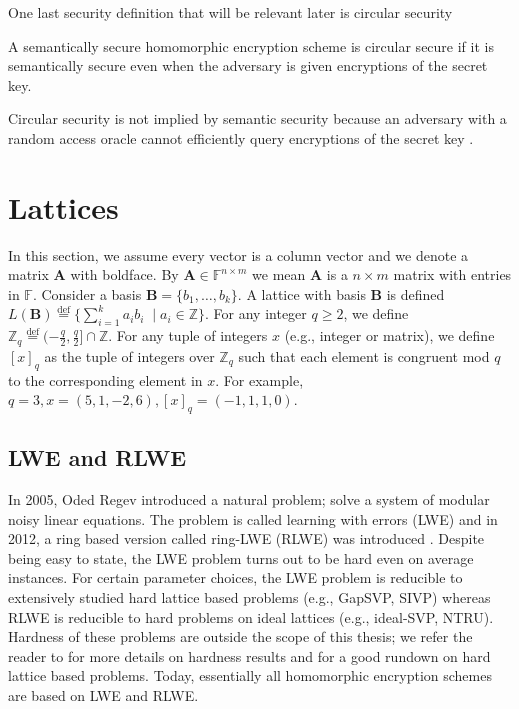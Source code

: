 
One last security definition that will be relevant later is circular security
\begin{definition}
    A semantically secure homomorphic encryption scheme is circular secure if it is semantically secure even when the adversary is given encryptions of the secret key.
\end{definition}
\begin{remark}
    Circular security is not implied by semantic security because an adversary with a random access oracle cannot efficiently query encryptions of the secret key \cite{Bra18-survey}.
\end{remark}

\chapter{Lattices}\label{sec:lattices}

In this section, we assume every vector is a column vector and we denote a matrix $\textbf{A}$ with boldface. By $\textbf{A} \in \mathbb{F}^{n \times m}$ we mean $\textbf{A}$ is a $n \times m$ matrix with entries in $\mathbb{F}$. Consider a basis $\textbf{B} = \{b_1, \dots, b_k\}$. A lattice with basis $\textbf{B}$ is defined $L(\textbf{B}) \stackrel{\mathrm{def}}{=} \{ \sum_{i=1}^k a_i b_i \; \mid a_i \in \mathbb{Z}\}$. For any integer $q \geq 2$, we define $\mathbb{Z}_q \stackrel{\mathrm{def}}{=} (-\frac{q}{2}, \frac{q}{2}] \cap \mathbb{Z}$. For any tuple of integers $x$ (e.g., integer or matrix), we define $[x]_q$ as the tuple of integers over $\mathbb{Z}_q$ such that each element is congruent mod $q$ to the corresponding element in $x$. For example, $q = 3, x = (5,1,-2,6), [x]_q = (-1,1,1,0)$.

\section{LWE and RLWE}\label{subsec:LWE}
In 2005, Oded Regev introduced \cite{Reg05-LWE} a natural problem; solve a system of modular noisy linear equations. The problem is called learning with errors (LWE) and in 2012, a ring based version called ring-LWE (RLWE) was introduced \cite{RLWE}. Despite being easy to state, the LWE problem turns out to be hard even on average instances. For certain parameter choices, the LWE problem is reducible to extensively studied hard lattice based problems (e.g., GapSVP, SIVP) whereas RLWE is reducible to hard problems on ideal lattices (e.g., ideal-SVP, NTRU). Hardness of these problems are outside the scope of this thesis; we refer the reader to \cite{Reg05-LWE, LWE-classical-reduction, LWE-hardness, RLWE} for more details on hardness results and \cite{Pei16-decade} for a good rundown on hard lattice based problems. Today, essentially all homomorphic encryption schemes are based on LWE and RLWE.


